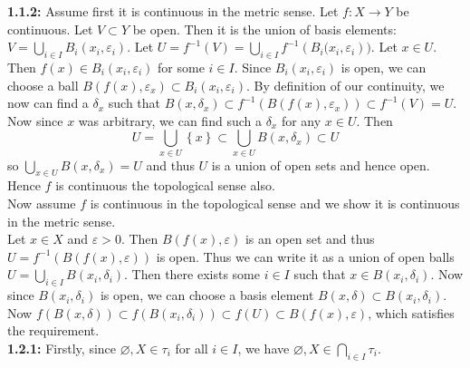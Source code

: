 \documentclass[a4paper]{article}
\begin{document}
    \textbf{1.1.2:} Assume first it is continuous in the metric sense. 
    Let $f  \colon X \to Y$ be continuous. Let $V \subset Y$ be open. Then
    it is the union of basis elements: $V = \bigcup_{i \in  I} B_i(x_i,
    \varepsilon_i)$. Let $U = f^{-1} (V) = \bigcup_{i \in I} f^{-1} \left( 
    B_i (x_i, \varepsilon_i\right) )$. Let $x \in U$. Then $f(x) \in B_i (x_i,
    \varepsilon_i)$ for some $i \in I$. Since $B_i\left( x_i, \varepsilon_i
    \right) $ is open, we can choose a ball $B\left( f(x), \varepsilon_x \right)  \subset B_i \left( x_i,
    \varepsilon_i \right) $. By definition of our continuity, we now can find
    a $\delta_x$ such that $B\left( x, \delta_x \right) \subset 
    f^{-1} \left( B \left( f(x), \varepsilon_x \right)  \right) 
    \subset f^{-1}(V) = U$. Now since $x$ was arbitrary, we can find such
    a $\delta_x$ for any $x \in U$. Then
    \[
    U = \bigcup_{x \in U} \left\{ x \right\} \subset \bigcup_{x \in U} B\left(
    x, \delta_x \right) \subset U
    \] 
    so $\bigcup_{x \in U} B\left( x, \delta_x \right) = U$ and thus $U$ is
    a union of open sets and hence open.\\
    Hence $f$ is continuous the topological sense also.\\
    \linebreak
    Now assume $f$ is continuous in the topological sense and we show it is
    continuous in the metric sense.\\
    \linebreak
    Let $x \in X$ and $\varepsilon > 0$. Then  $B\left( f(x), \varepsilon
    \right) $ is an open set and thus $ U = f^{-1}\left( B\left( f(x),\varepsilon
    \right)  \right) $ is open. Thus we can write it as a union of open balls
    $U = \bigcup_{i \in  I} B\left( x_i, \delta_i \right) $. Then there exists
    some $i \in I$ such that $x \in B\left( x_i, \delta_i \right) $. Now since
    $B\left( x_i, \delta_i \right) $ is open, we can choose a basis element
    $B\left( x, \delta \right) \subset B\left( x_i, \delta_i \right) $. Now
    $f\left( B\left( x, \delta \right)  \right) 
    \subset f\left( B\left( x_i, \delta_i \right)  \right) 
    \subset f(U) \subset B\left( f(x), \varepsilon \right) $, which satisfies
    the requirement.\\
    \linebreak
    \textbf{1.2.1:} Firstly, since  $\varnothing, X \in \tau_i$ for all $i \in
    I$, we have
    $\varnothing, X \in \bigcap_{i \in  I} \tau_i$.\\
    \linebreak
\end{document}
